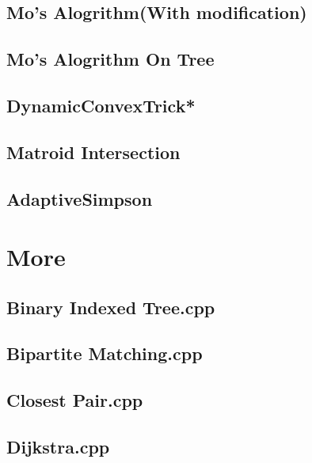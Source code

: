 \subsection{Mo's Alogrithm(With modification)}

\subsection{Mo's Alogrithm On Tree}

\subsection{DynamicConvexTrick*} %

% 
\subsection{Matroid Intersection}

\subsection{AdaptiveSimpson}


\section{More}
\subsection{Binary Indexed Tree.cpp}

\subsection{Bipartite Matching.cpp}

\subsection{Closest Pair.cpp}

\subsection{Dijkstra.cpp}

